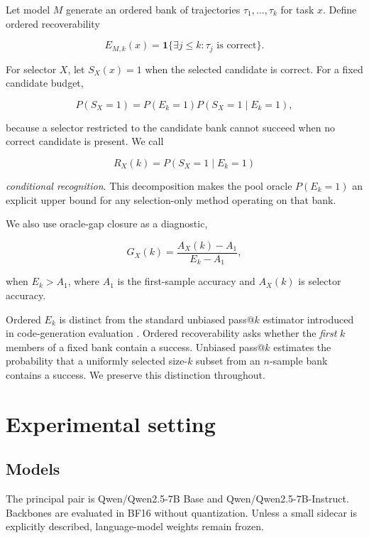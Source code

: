 \documentclass[11pt]{article}
\begin{document}
Let model $M$ generate an ordered bank of trajectories $\tau_1,\ldots,\tau_k$ for task $x$. Define ordered recoverability

\begin{equation}
E_{M,k}(x)=\mathbf{1}\{\exists j\leq k:\tau_j\text{ is correct}\}.
\end{equation}

For selector $X$, let $S_X(x)=1$ when the selected candidate is correct. For a fixed candidate budget,

\begin{equation}
P(S_X=1)=P(E_k=1)P(S_X=1\mid E_k=1),
\end{equation}

because a selector restricted to the candidate bank cannot succeed when no correct candidate is present. We call

\begin{equation}
R_X(k)=P(S_X=1\mid E_k=1)
\end{equation}

\emph{conditional recognition}. This decomposition makes the pool oracle $P(E_k=1)$ an explicit upper bound for any selection-only method operating on that bank.

We also use oracle-gap closure as a diagnostic,

\begin{equation}
G_X(k)=\frac{A_X(k)-A_1}{E_k-A_1},
\end{equation}

when $E_k>A_1$, where $A_1$ is the first-sample accuracy and $A_X(k)$ is selector accuracy.

Ordered $E_k$ is distinct from the standard unbiased pass@$k$ estimator introduced in code-generation evaluation \cite{chen2021codex}. Ordered recoverability asks whether the \emph{first} $k$ members of a fixed bank contain a success. Unbiased pass@$k$ estimates the probability that a uniformly selected size-$k$ subset from an $n$-sample bank contains a success. We preserve this distinction throughout.

\section{Experimental setting}

\subsection{Models}

The principal pair is Qwen/Qwen2.5-7B Base and Qwen/Qwen2.5-7B-Instruct. Backbones are evaluated in BF16 without quantization. Unless a small sidecar is explicitly described, language-model weights remain frozen.
\end{document}
